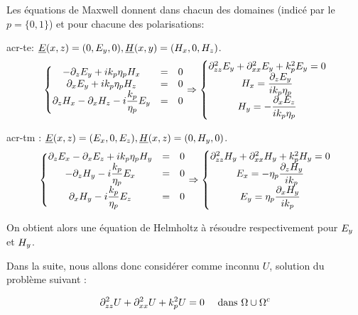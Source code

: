Les équations de Maxwell donnent dans chacun des domaines (indicé par le $p = \lbrace0,1\rbrace$) et pour chacune des polarisations:

\Gls{acr-te}: $ \underline{E}({x},{z}) = (0,E_y,0), \underline{H}({x},{y}) = (H_x,0,H_z)$. 
\[
\left\lbrace 
\begin{matrix}
-\partial_{{z}} E_{y} + i k_p \eta_p H_{x} & = & 0 \\
\partial_{{x}} E_{y} + i k_p \eta_p H_{z} &= & 0 \\
\partial_{{z}} H_{x}- \partial_{{x}} H_{z} - i\dfrac{k_p}{\eta_p} E_{y} & = & 0\\
\end{matrix}
\right.
\Rightarrow
\left\lbrace
\begin{matrix}
\partial_{{z}{z}}^2 E_{y} + \partial_{{x}{x}}^2 E_{y} + k_p^2 E_{y} = 0\\
H_{x} = \dfrac{\partial_{{z}} E_{y}}{i k_p \eta_p }\\
H_{y} =  -\dfrac{\partial_{{x}} E_{z}}{i k_p \eta_p }
\end{matrix}
\right.
\]

\Gls{acr-tm} : $ \underline{E}({x},{z}) = (E_{x},0,E_{z}), \underline{H}({x},{z}) = (0,H_{y},0)$. 
\[
\left\lbrace 
\begin{matrix}
\partial_{{z}} E_{x} - \partial_{{x}} E_{z} + i k_p \eta_p  H_{y} &= & 0 \\
- \partial_{{z}} H_{y} - i\dfrac{k_p}{\eta_p} E_{x} & = & 0\\
\partial_{{x}} H_{y} -i\dfrac{k_p}{\eta_p} E_{z} &=&0\\
\end{matrix}
\right.
\Rightarrow
\left\lbrace
\begin{matrix}
\partial_{{z}{z}}^2 H_{y} + \partial_{{x}{x}}^2 H_{y} + k_p^2 H_{y} = 0\\
E_{x} = -\eta_p\dfrac{\partial_{{z}} H_{y}}{i k_p}\\
E_{y} = \eta_p\dfrac{\partial_{{x}} H_{y}}{i k_p}
\end{matrix}
\right.
\]

On obtient alors une équation de Helmholtz à résoudre respectivement pour $E_{y}$ et $H_{y}$.

Dans la suite, nous allons donc considérer comme inconnu $U$, solution du problème suivant : 

\begin{equation}
\partial_{{z}{z}}^2 U + \partial_{{x}{x}}^2 U + k_p^2 U = 0 \quad \text { dans $\Omega\cup\Omega^c$}
\end{equation}


